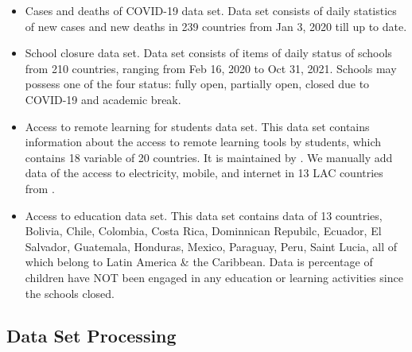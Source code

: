 \documentclass{article}
\begin{document}
\begin{itemize}


\item Cases and deaths of COVID-19 data set. Data set consists of daily statistics of new cases and new deaths in 239 countries from Jan 3, 2020 till up to date.

\item School closure data set. Data set consists of items of daily status of schools from 210 countries, ranging from Feb 16, 2020 to Oct 31, 2021. Schools may possess one of the four status: fully open, partially open, closed due to COVID-19 and academic break. 

\item Access to remote learning for students data set. This data set contains information about the access to remote learning tools by students, which contains 18 variable of 20 countries. It is maintained by \cite{maintained}. We manually add data of the access to electricity, mobile, and internet in 13 LAC countries from \cite{WorldBank}. 

\item Access to education data set. This data set contains data of 13 countries, Bolivia, Chile, Colombia, Costa Rica, Dominnican Repubilc, Ecuador, El Salvador, Guatemala, Honduras, Mexico, Paraguay, Peru, Saint Lucia, all of which belong to Latin America \& the Caribbean. Data is percentage of children have NOT been engaged in any education or learning activities since the schools closed. 


\end{itemize}

\subsection{Data Set Processing}
\end{document}
